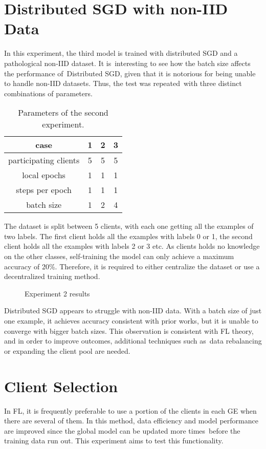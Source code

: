 \section{Distributed SGD with non-IID Data}
In this experiment, the third model is trained with distributed SGD and a pathological non-IID dataset. It is interesting to see how the batch size affects the performance of Distributed SGD, given that it is notorious for being unable to handle non-IID datasets. Thus, the test was repeated with three distinct combinations of parameters.
\begin{table}[H]
    \center
    \begin{tabular}{ | c | c | c | c | }
        \hline
        case & 1 & 2 & 3\\
        \hline\hline
        participating clients & 5 & 5 & 5 \\
        \hline
        local epochs & 1 & 1 & 1 \\
        \hline
        steps per epoch & 1 & 1 & 1 \\
        \hline
        batch size & 1 & 2 & 4 \\
        \hline
    \end{tabular}
    \caption[Experiment 2 Parameters]{Parameters of the second experiment.}
    \label{table:Experiment 2 parameters}
\end{table}
The dataset is split between 5 clients, with each one getting all the examples of two labels. The first client holds all the examples with labels 0 or 1, the second client holds all the examples with labels 2 or 3 etc. As clients holds no knowledge on the other classes, self-training the model can only achieve a maximum accuracy of 20\%. Therefore, it is required to either centralize the dataset or use a decentralized training method.
\begin{figure}[H]
    \center
    
    \caption[Experiment 2 results]{Experiment 2 results}
    \label{fig:Experiment 2 results}
\end{figure}
Distributed SGD appears to struggle with non-IID data. With a batch size of just one example, it achieves accuracy consistent with prior works\cite{FL-original-paper}, but it is unable to converge with bigger batch sizes. This observation is consistent with FL theory, and in order to improve outcomes, additional techniques such as data rebalancing or expanding the client pool are needed.

\section{Client Selection}
In FL, it is frequently preferable to use a portion of the clients in each GE when there are several of them. In this method, data efficiency and model performance are improved since the global model can be updated more times before the training data run out. This experiment aims to test this functionality.

